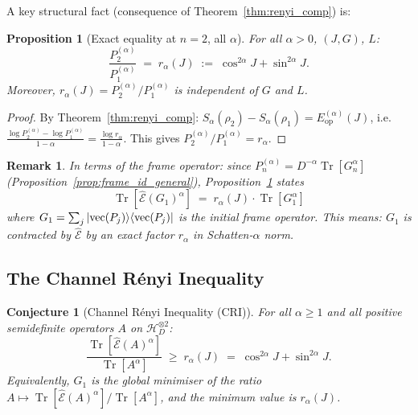 \documentclass[12pt,a4paper]{article}
\newtheorem{proposition}[theorem]{Proposition}
\newtheorem{remark}[theorem]{Remark}
\newtheorem{conjecture}[theorem]{Conjecture}
\begin{document}
A key structural fact (consequence of Theorem~\ref{thm:renyi_comp}) is:

\begin{proposition}[Exact equality at $n=2$, all $\alpha$]
\label{prop:ratio_n2_exact}
For all $\alpha>0$, $(J,G)$, $L$:
\[
  \frac{P_2^{(\alpha)}}{P_1^{(\alpha)}} \;=\; r_\alpha(J) \;:=\; \cos^{2\alpha}J+\sin^{2\alpha}J.
\]
Moreover, $r_\alpha(J)=P_2^{(\alpha)}/P_1^{(\alpha)}$ is independent of $G$ and $L$.
\end{proposition}

\begin{proof}
By Theorem~\ref{thm:renyi_comp}: $S_\alpha(\rho_2)-S_\alpha(\rho_1)=E_{\mathrm{op}}^{(\alpha)}(J)$,
i.e.\ $\frac{\log P_2^{(\alpha)}-\log P_1^{(\alpha)}}{1-\alpha}=\frac{\log r_\alpha}{1-\alpha}$.
This gives $P_2^{(\alpha)}/P_1^{(\alpha)}=r_\alpha$.
\end{proof}

\begin{remark}
In terms of the frame operator: since $P_n^{(\alpha)}=D^{-\alpha}\operatorname{Tr}[G_n^\alpha]$
(Proposition~\ref{prop:frame_id_general}), Proposition~\ref{prop:ratio_n2_exact} states
\[
  \operatorname{Tr}[\hat{\mathcal{E}}(G_1)^\alpha] \;=\; r_\alpha(J)\cdot\operatorname{Tr}[G_1^\alpha]
\]
where $G_1=\sum_j|{\rm vec}(P_j)\rangle\langle{\rm vec}(P_j)|$ is the initial frame operator.
This means: $G_1$ is contracted by $\hat{\mathcal{E}}$ by an exact factor $r_\alpha$ in Schatten-$\alpha$ norm.
\end{remark}

\subsection{The Channel Rényi Inequality}
\label{sec:cri}

\begin{conjecture}[Channel Rényi Inequality (CRI)]
\label{conj:cri}
For all $\alpha\geq 1$ and all positive semidefinite operators $A$ on $\mathcal{H}_D^{\otimes 2}$:
\[
  \frac{\operatorname{Tr}[\hat{\mathcal{E}}(A)^\alpha]}{\operatorname{Tr}[A^\alpha]}
  \;\geq\; r_\alpha(J) \;=\; \cos^{2\alpha}J + \sin^{2\alpha}J.
\]
Equivalently, $G_1$ is the global minimiser of the ratio
$A\mapsto\operatorname{Tr}[\hat{\mathcal{E}}(A)^\alpha]/\operatorname{Tr}[A^\alpha]$,
and the minimum value is $r_\alpha(J)$.
\end{conjecture}
\end{document}
